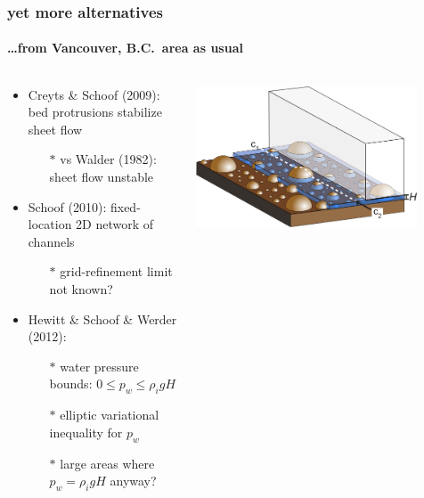 \documentclass[hide notes,intlimits]{beamer}
\begin{document}
\begin{frame}
  \frametitle{yet more alternatives}
  \framesubtitle{\dots from Vancouver, B.C.~area as usual}

\small
\begin{columns}
\begin{column}{0.6\textwidth}
  \begin{itemize}
  \item  Creyts \& Schoof (2009): bed protrusions stabilize sheet flow
      \begin{itemize}
      \vspace{-1mm}
      \item[$\ast$] vs Walder (1982): sheet flow unstable
      \end{itemize}

  \bigskip
  \item  Schoof (2010): fixed-location 2D network of channels
      \begin{itemize}
      \vspace{-1mm}
      \item[$\ast$] grid-refinement limit not known?
      \end{itemize}
      
  \bigskip
  \item  Hewitt \& Schoof \& Werder (2012):
      \begin{itemize}
      \vspace{-1mm}
      \item[$\ast$] water pressure bounds: $0 \le p_w \le \rho_i g H$
      \item[$\ast$] elliptic variational inequality for $p_w$
      \item[$\ast$] large areas where $p_w = \rho_i g H$ anyway?
      \end{itemize}
  \end{itemize}
\end{column}

\begin{column}{0.4\textwidth}
\begin{center}
\vspace{-5mm}
\includegraphics[width=0.85\textwidth]{creyts-sheetflow}


\end{center}
\end{column}
\end{columns}
\end{frame}
\end{document}
